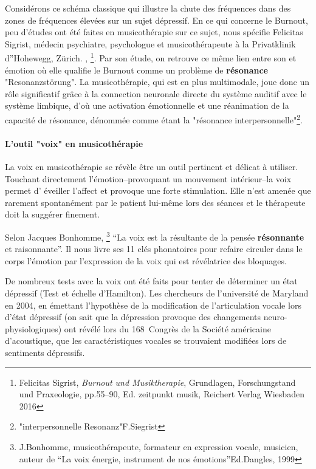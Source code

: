 Considérons ce schéma classique qui illustre la
chute des fréquences dans des zones de fréquences élevées sur un sujet
dépressif.
En ce qui concerne le Burnout,  peu d'études ont été  faites en musicothérapie
sur ce sujet, nous spécifie Felicitas Sigrist, médecin
psychiatre, psychologue et musicothérapeute à la Privatklinik
d''Hohewegg, Zürich. \autocite[pp.55--90, ``Burnout und 
		Musiktherapie''] {sigrist_burnout_2016,}, \footnote{Felicitas Sigrist,  
\textit{Burnout und 
		Musiktherapie}, Grundlagen, Forschungstand und Praxeologie, pp.55--90, Ed. 
	zeitpunkt musik, Reichert Verlag Wiesbaden 2016}. Par son étude, on retrouve ce 
	même lien entre son et 
émotion où elle qualifie le Burnout comme un problème de \textbf{résonance} "Resonanzstörung". La 
musicothérapie, qui est en plus multimodale, joue donc un rôle significatif grâce à la 
connection 
neuronale directe du système auditif avec le système limbique, d'où une activation 
émotionnelle et une  réanimation de  la capacité de résonance, dénommée comme 
étant la 
"résonance interpersonnelle"\footnote{"interpersonnelle Resonanz"F.Siegrist}.

\paragraph{L'outil "voix" en musicothérapie}

La voix en musicothérapie se révèle être un outil pertinent et délicat
à utiliser. Touchant 
directement 
l'émotion--provoquant un mouvement intérieur--la voix permet d'
éveiller l'affect
et provoque une forte stimulation. Elle n'est amenée que rarement
spontanément par le patient lui-même lors des séances et le thérapeute doit la suggérer
finement.

Selon Jacques Bonhomme, \footnote{J.Bonhomme, musicothérapeute, formateur 
  	en expression vocale, musicien, auteur de ``La voix énergie,
        instrument de nos émotions''Ed.Dangles, 1999} ``La voix est la
      résultante de la pensée \textbf{résonnante}  et raisonnante''.
      Il nous livre ses 11 clés phonatoires pour refaire circuler dans
      le corps 
      l'émotion par l'expression de la voix qui est révélatrice des bloquages.

De nombreux tests avec 
la voix
 ont été faits pour tenter de déterminer un état dépressif 
(Test et échelle d'Hamilton). Les chercheurs de l'université de Maryland en 
2004,
en émettant l'hypothèse de la modification de l'articulation vocale 
lors d'état dépressif (on sait que la dépression provoque des changements  
neuro-physiologiques) ont révélé lors du 168\ieme\ Congrès de la Société
américaine d'acoustique, que les caractéristiques 
vocales se trouvaient modifiées lors de sentiments 
dépressifs\autocite{le_service_metronews}.

